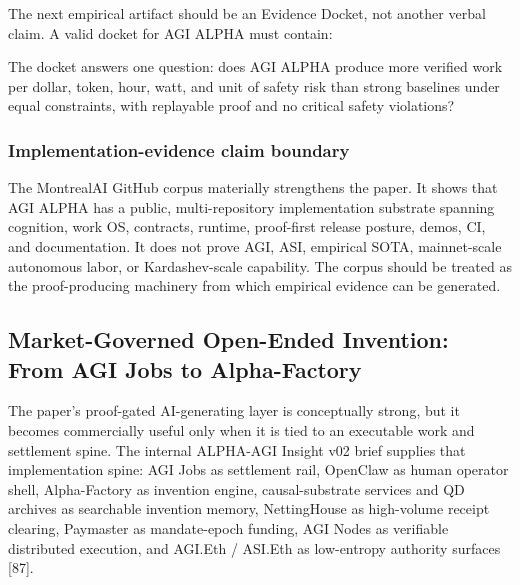 The next empirical artifact should be an Evidence Docket, not another
verbal claim. A valid docket for AGI ALPHA must contain:

\begin{Shaded}
\begin{Highlighting}[]
\end{Highlighting}
\end{Shaded}

The docket answers one question: does AGI ALPHA produce more verified
work per dollar, token, hour, watt, and unit of safety risk than strong
baselines under equal constraints, with replayable proof and no critical
safety violations?

\subsubsection{Implementation-evidence claim
boundary}\label{implementation-evidence-claim-boundary}

The MontrealAI GitHub corpus materially strengthens the paper. It shows
that AGI ALPHA has a public, multi-repository implementation substrate
spanning cognition, work OS, contracts, runtime, proof-first release
posture, demos, CI, and documentation. It does not prove AGI, ASI,
empirical SOTA, mainnet-scale autonomous labor, or Kardashev-scale
capability. The corpus should be treated as the proof-producing
machinery from which empirical evidence can be generated.

\subsection{Market-Governed Open-Ended Invention: From AGI Jobs to
Alpha-Factory}\label{market-governed-open-ended-invention-from-agi-jobs-to-alpha-factory}

The paper's proof-gated AI-generating layer is conceptually strong, but
it becomes commercially useful only when it is tied to an executable
work and settlement spine. The internal ALPHA-AGI Insight v02 brief
supplies that implementation spine: AGI Jobs as settlement rail,
OpenClaw as human operator shell, Alpha-Factory as invention engine,
causal-substrate services and QD archives as searchable invention
memory, NettingHouse as high-volume receipt clearing, Paymaster as
mandate-epoch funding, AGI Nodes as verifiable distributed execution,
and AGI.Eth / ASI.Eth as low-entropy authority surfaces {[}87{]}.


